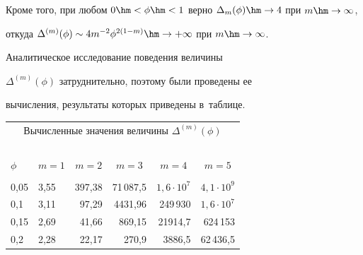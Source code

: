 Кроме того, при любом $0\hm<\phi\hm<1$ верно $\Delta_m(\phi)\hm\to 4$ при $m\hm\to\infty$,


откуда $\Delta^{(m)}(\phi)\sim 4m^{-2}\phi^{2(1-m)}\hm\to +\infty$ при $m\hm\to\infty$.





Аналитическое исследование поведения величины


$\Delta^{(m)}(\phi)$ затруднительно, поэтому были проведены ее


вычисления, результаты которых приведены в~таб\-лице.





\begin{table}\small


\begin{center}








\begin{tabular}{|l|l|r|r|r|r|}


\multicolumn{6}{c}{Вычисленные значения величины $\Delta^{(m)}(\phi)$}\\


\multicolumn{6}{c}{\ }\\[-6pt]


\hline


$\phi$ & $m=1$ & \multicolumn{1}{c|}{$m=2$} & \multicolumn{1}{c|}{$m=3$} & \multicolumn{1}{c|}{$m=4$} & \multicolumn{1}{c|}{$m=5$} \\


\hline


&&&&&\\[-9pt]


0,05 & 3,55 & 397,38\hphantom{99} & 71\,087,5\hphantom{999} & $1,6\cdot 10^7$\hphantom{99} & $4,1\cdot 10^9$\hphantom{99}\\


0,1 & 3,11 & 97,29\hphantom{99} & 4431,96\hphantom{99} & 249\,930\hphantom{999,9} & $1,6\cdot 10^7$\hphantom{99}\\


0,15 & 2,69 & 41,66\hphantom{99} & 869,15\hphantom{99} & 21914,7\hphantom{999} & 624\,153\hphantom{,9999} \\


0,2 & 2,28 & 22,17\hphantom{99} & 270,9\hphantom{999} & 3886,5\hphantom{999} & 62\,436,5\hphantom{999} \\



\end{tabular}
\end{center}
\end{table}
